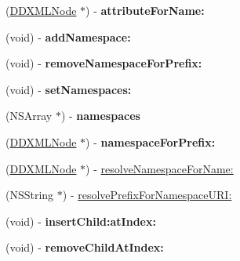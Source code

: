 \begin{DoxyCompactItemize}
\item 
\hypertarget{interface_d_d_x_m_l_element_a998987d606b59c30b43360406b06774f}{}(\hyperlink{interface_d_d_x_m_l_node}{D\+D\+X\+M\+L\+Node} $\ast$) -\/ {\bfseries attribute\+For\+Name\+:}\label{interface_d_d_x_m_l_element_a998987d606b59c30b43360406b06774f}

\item 
\hypertarget{interface_d_d_x_m_l_element_adcbfea1c3efc3102bde4831c2bf5437c}{}(void) -\/ {\bfseries add\+Namespace\+:}\label{interface_d_d_x_m_l_element_adcbfea1c3efc3102bde4831c2bf5437c}

\item 
\hypertarget{interface_d_d_x_m_l_element_a4a6d35625bf8bae382c650db32409084}{}(void) -\/ {\bfseries remove\+Namespace\+For\+Prefix\+:}\label{interface_d_d_x_m_l_element_a4a6d35625bf8bae382c650db32409084}

\item 
\hypertarget{interface_d_d_x_m_l_element_aa87350fd4ed836b2824d6af024a0ce66}{}(void) -\/ {\bfseries set\+Namespaces\+:}\label{interface_d_d_x_m_l_element_aa87350fd4ed836b2824d6af024a0ce66}

\item 
\hypertarget{interface_d_d_x_m_l_element_a4b3cbbf95d5753e0ef5ad45a583092d7}{}(N\+S\+Array $\ast$) -\/ {\bfseries namespaces}\label{interface_d_d_x_m_l_element_a4b3cbbf95d5753e0ef5ad45a583092d7}

\item 
\hypertarget{interface_d_d_x_m_l_element_a845db7983835b7d67ee8bb227bed8a4c}{}(\hyperlink{interface_d_d_x_m_l_node}{D\+D\+X\+M\+L\+Node} $\ast$) -\/ {\bfseries namespace\+For\+Prefix\+:}\label{interface_d_d_x_m_l_element_a845db7983835b7d67ee8bb227bed8a4c}

\item 
(\hyperlink{interface_d_d_x_m_l_node}{D\+D\+X\+M\+L\+Node} $\ast$) -\/ \hyperlink{interface_d_d_x_m_l_element_a5b10c2a937e0bb1681c6a099542458e8}{resolve\+Namespace\+For\+Name\+:}
\item 
(N\+S\+String $\ast$) -\/ \hyperlink{interface_d_d_x_m_l_element_a61f78441a5c021a7da5fe1570ba3da5a}{resolve\+Prefix\+For\+Namespace\+U\+R\+I\+:}
\item 
\hypertarget{interface_d_d_x_m_l_element_af5fc5fcc78f0c51bd3dda72292d72686}{}(void) -\/ {\bfseries insert\+Child\+:at\+Index\+:}\label{interface_d_d_x_m_l_element_af5fc5fcc78f0c51bd3dda72292d72686}

\item 
\hypertarget{interface_d_d_x_m_l_element_ad12f97b30c903951dfd250619187f3ac}{}(void) -\/ {\bfseries remove\+Child\+At\+Index\+:}\label{interface_d_d_x_m_l_element_ad12f97b30c903951dfd250619187f3ac}


\end{DoxyCompactItemize}

